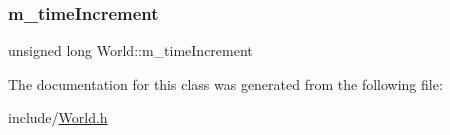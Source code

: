 \subsubsection{\texorpdfstring{m\+\_\+time\+Increment}{m\_timeIncrement}}
{\footnotesize\ttfamily unsigned long World\+::m\+\_\+time\+Increment\hspace{0.3cm}{\ttfamily [private]}}



The documentation for this class was generated from the following file\+:\begin{DoxyCompactItemize}
\item 
include/\hyperlink{_world_8h}{World.\+h}\end{DoxyCompactItemize}
